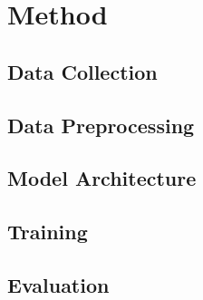 \section{Method}
\label{sec:method}

\subsection{Data Collection}
\label{sec:data-collection}

\subsection{Data Preprocessing}
\label{sec:data-preprocessing}

\subsection{Model Architecture}
\label{sec:model-architecture}

\subsection{Training}
\label{sec:training}

\subsection{Evaluation}
\label{sec:evaluation}